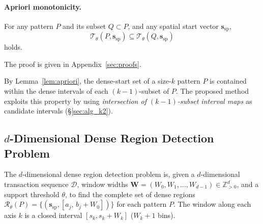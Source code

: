 \paragraph{Apriori monotonicity.}

\begin{lemma}\label{lem:apriori}
For any pattern $P$ and its subset $Q \subset P$,
and any spatial start vector $\bm{s}_{\mathrm{sp}}$,
\[
  \mathcal{T}_\theta(P,\bm{s}_{\mathrm{sp}})
  \subseteq
  \mathcal{T}_\theta(Q,\bm{s}_{\mathrm{sp}})
\]
holds.
\end{lemma}

The proof is given in Appendix~\ref{sec:proofs}.

By Lemma~\ref{lem:apriori},
the dense-start set of a size-$k$ pattern $P$
is contained within the dense intervals
of each $(k{-}1)$-subset of $P$.
The proposed method exploits this property
by using \emph{intersection of $(k{-}1)$-subset interval maps}
as candidate intervals (\S\ref{sec:alg_k2}).

\subsection{$d$-Dimensional Dense Region Detection Problem}\label{sec:dense_detection}

The $d$-dimensional dense region detection problem is,
given a $d$-dimensional transaction sequence $\mathcal{D}$,
window widths
$\bm{W} = (W_0, W_1, \ldots, W_{d-1}) \in \mathbb{Z}_{>0}^d$,
and a support threshold $\theta$,
to find the complete set of dense regions
$\mathcal{R}_\theta(P)
= \{(\bm{s}_{\mathrm{sp}}, [a_j,\, b_j + W_0])\}$
for each pattern $P$.
The window along each axis $k$ is a closed interval
$[s_k, s_k + W_k]$ ($W_k + 1$ bins).
